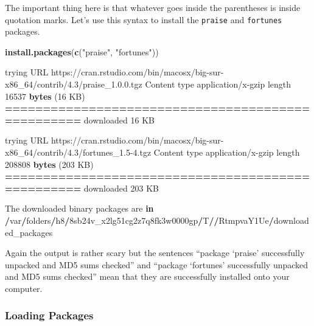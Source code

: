 \documentclass[
]{book}
\newenvironment{Shaded}{\begin{snugshade}}{\end{snugshade}}
\newcommand{\ControlFlowTok}[1]{\textcolor[rgb]{0.13,0.29,0.53}{\textbf{#1}}}
\newcommand{\DecValTok}[1]{\textcolor[rgb]{0.00,0.00,0.81}{#1}}
\newcommand{\ErrorTok}[1]{\textcolor[rgb]{0.64,0.00,0.00}{\textbf{#1}}}
\newcommand{\FunctionTok}[1]{\textcolor[rgb]{0.13,0.29,0.53}{\textbf{#1}}}
\newcommand{\NormalTok}[1]{#1}
\newcommand{\SpecialCharTok}[1]{\textcolor[rgb]{0.81,0.36,0.00}{\textbf{#1}}}
\newcommand{\StringTok}[1]{\textcolor[rgb]{0.31,0.60,0.02}{#1}}
\begin{document}
The important thing here is that whatever goes inside the parentheses is inside quotation marks. Let's use this syntax to install the \texttt{praise} and \texttt{fortunes} packages.

\begin{Shaded}
\begin{Highlighting}[]
\FunctionTok{install.packages}\NormalTok{(}\FunctionTok{c}\NormalTok{(}\StringTok{"praise"}\NormalTok{, }\StringTok{"fortunes"}\NormalTok{))}


\NormalTok{trying URL }\StringTok{\textquotesingle{}https://cran.rstudio.com/bin/macosx/big{-}sur{-}x86\_64/contrib/4.3/praise\_1.0.0.tgz\textquotesingle{}}
\NormalTok{Content type }\StringTok{\textquotesingle{}application/x{-}gzip\textquotesingle{}}\NormalTok{ length }\DecValTok{16537} \FunctionTok{bytes}\NormalTok{ (}\DecValTok{16}\NormalTok{ KB)}
\SpecialCharTok{==}\ErrorTok{================================================}
\NormalTok{downloaded }\DecValTok{16}\NormalTok{ KB}

\NormalTok{trying URL }\StringTok{\textquotesingle{}https://cran.rstudio.com/bin/macosx/big{-}sur{-}x86\_64/contrib/4.3/fortunes\_1.5{-}4.tgz\textquotesingle{}}
\NormalTok{Content type }\StringTok{\textquotesingle{}application/x{-}gzip\textquotesingle{}}\NormalTok{ length }\DecValTok{208808} \FunctionTok{bytes}\NormalTok{ (}\DecValTok{203}\NormalTok{ KB)}
\SpecialCharTok{==}\ErrorTok{================================================}
\NormalTok{downloaded }\DecValTok{203}\NormalTok{ KB}


\NormalTok{The downloaded binary packages are }\ControlFlowTok{in}
    \SpecialCharTok{/}\NormalTok{var}\SpecialCharTok{/}\NormalTok{folders}\SpecialCharTok{/}\NormalTok{h8}\SpecialCharTok{/}\NormalTok{8sb24v\_x2lg51cg2z7q8fk3w0000gp}\SpecialCharTok{/}\NormalTok{T}\SpecialCharTok{/}\ErrorTok{/}\NormalTok{RtmpvaY1Ue}\SpecialCharTok{/}\NormalTok{downloaded\_packages}
\end{Highlighting}
\end{Shaded}

Again the output is rather scary but the sentences ``package `praise' successfully unpacked and MD5 sums checked'' and ``package `fortunes' successfully unpacked and MD5 sums checked'' mean that they are successfully installed onto your computer.

\hypertarget{loading-packages}{%
\subsubsection{Loading Packages}\label{loading-packages}}
\end{document}
